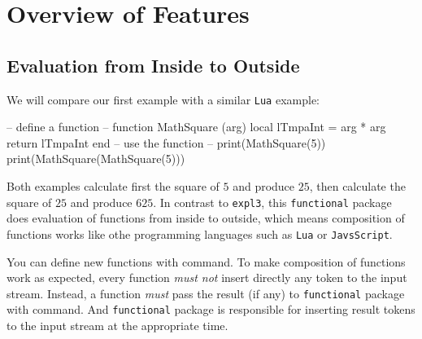 \documentclass[oneside]{book}
\begin{document}
\chapter{Overview of Features}

\section{Evaluation from Inside to Outside}

We will compare our first example with a similar \verb!Lua! example:

\begin{minipage}{0.55\textwidth}
\begin{codehigh}
\IgnoreSpacesOn
\prgNewFunction {} {
  \intSet {}
  \prgReturn {\expValue \lTmpaInt}
}
\IgnoreSpacesOff
{}
\end{codehigh}
\end{minipage}%
\begin{minipage}{0.45\textwidth}
\begin{code}
-- define a function --
function MathSquare (arg)
  local lTmpaInt = arg * arg
  return lTmpaInt
end
-- use the function --
print(MathSquare(5))
print(MathSquare(MathSquare(5)))
\end{code}
\end{minipage}



Both examples calculate first the square of $5$ and produce $25$,
then calculate the square of $25$ and produce $625$.
In contrast to \verb!expl3!, this \verb!functional! package
does evaluation of functions from inside to outside,
which means composition of functions works like othe programming languages
such as \verb!Lua! or \verb!JavsScript!.

You can define new functions with  command.
To make composition of functions work as expected,
every function \emph{must not} insert directly any token to the input stream.
Instead, a function \emph{must} pass the result (if any) to \verb!functional! package
with  command. And \verb!functional! package is responsible for
inserting result tokens to the input stream at the appropriate time.
\end{document}
